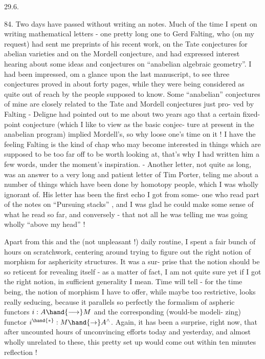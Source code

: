 
29.6.

84. Two days have passed without writing an  notes. Much of the
time I spent on writing mathematical letters - one pretty long one to
Gerd Falting, who (on my request) had sent me preprints of his 
recent work,  on the Tate conjectures for abelian varieties and on the
Mordell conjecture, and had expressed interest hearing about some ideas
and conjectures on ``anabelian algebraic geometry''. I had been impressed,
om a glance upon the last  manuscript, to see three  conjectures 
proved in about forty pages, while they were being considered as quite
out of reach by the people supposed to know. Some ``anabelian'' conjectures
of mine are closely related to the Tate and Mordell conjectures just pro-%
ved by Falting - Deligne had pointed out to me about two years ago that
a certain fixed-point conjecture (which I like to view as the basic conjec-%
ture at present in the anabelian program) implied Mordell's, so why loose
one's time on it ! I have the feeling Falting is the kind of chap who
may become interested in things which are supposed to be too far off to
be worth looking at, that's why I had written him a few words, under
the moment's inspiration. - Another letter, not quite as long, was an
answer to a very long and patient letter of Tim Porter, teling me about
a number of things which have been done by homotopy people,  which I was
 wholly ignorant of. His letter has been the first echo I got from some-%
one who read part of the notes on ``Pursuing stacks'' , and I was glad he
could make some sense of what he read so far, and conversely - that not
all he was telling me was going wholly ``above my head'' !

Apart from this and the (not unpleasant !) daily routine, I spent
a fair bunch of hours on scratchwork, centering around trying to figure
out the right notion of morphism for asphericity structures. It was a sur-%
prise that the notion should be so reticent for revealing itself - as a
matter of fact, I am not quite sure yet if I got the right notion, in
sufficient generality I mean. Time will tell - for the time being,
the notion of morphism I have to offer, while maybe too restrictive,
looks really seducing, because it parallels so perfectly the formalism
of aspheric functors $i: A \hand{\longrightarrow} M$ and the corresponding (would-be modeli-%
zing) functor $i^{\hand{*}}: M \hand{\to} A^{\wedge}$. Again, it has been a surprise, right now,
that after uncounted hours of unconvincing efforts today and yesterday,
and almost wholly unrelated to these, this pretty set up would come out
within ten minutes reflection !

